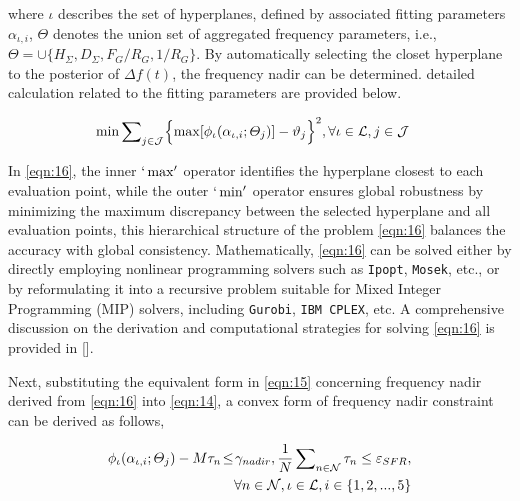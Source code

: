 \documentclass[lettersize,journal]{IEEEtran}
\def\code#1{\texttt{#1}}
\begin{document}
\noindent where \(\iota\) describes the set of hyperplanes, defined by associated fitting parameters \(\alpha_{\iota,i}\), \(\varTheta\) denotes the union set of aggregated frequency parameters, i.e., \(\varTheta=\cup \{H_{\varSigma},D_{\varSigma},F_{G}/R_{G},1/R_{G}\}\). By automatically selecting the closet hyperplane to the posterior of \(\varDelta f(t)\), the frequency nadir can be determined. detailed calculation related to the fitting parameters are provided below.

\vspace{-0.125in} 
\begin{small} \begin{align}
	\min & \sum\nolimits_{j\in\mathcal{J}} \Bigl\{\max[\phi_{\iota}(\alpha_{\iota, i}; \varTheta_{j})]- \vartheta _{j}\Bigr\} ^{2}, \forall \iota\in\mathcal{L}, j\in\mathcal{J} \label{eqn:16} 
\end{align} \end{small}

In \eqref{eqn:16}, the inner \(`\max'\) operator identifies the hyperplane closest to each evaluation point, while the outer \(`\min'\) operator ensures global robustness by minimizing the maximum discrepancy between the selected hyperplane and all evaluation points, this hierarchical structure of the problem \eqref{eqn:16} balances the accuracy with global consistency. Mathematically, \eqref{eqn:16} can be solved either by directly employing nonlinear programming solvers such as \code{Ipopt}, \code{Mosek}, etc., or by reformulating it into a recursive problem suitable for Mixed Integer Programming (MIP) solvers, including \code{Gurobi}, \code{IBM CPLEX}, etc. A comprehensive discussion on the derivation and computational strategies for solving \eqref{eqn:16} is provided in [].


Next, substituting the equivalent form in \eqref{eqn:15} concerning frequency nadir derived from \eqref{eqn:16} into \eqref{eqn:14}, a convex form of frequency nadir constraint can be derived as follows,

\vspace{-0.125in}
	\begin{small} \begin{align}
		\phi_{\iota}(\alpha_{\iota, i}; \varTheta_{j}) - M\tau_{n}\! \leq \!\gamma_{nadir},\frac{1}{{N}}\sum\nolimits_{n\in\mathcal{N}}\tau_{n} \leq \varepsilon_{SFR},\notag\\
		  \forall n \in \mathcal{N},\iota\in\mathcal{L},i\in\{1,2,...,5\} \label{eqn:17}
	\end{align}
\end{small}
\end{document}
